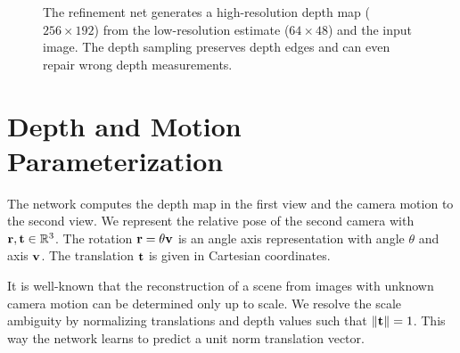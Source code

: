 \documentclass[10pt,twocolumn,letterpaper]{article}
\begin{document}
\begin{figure}
\begin{center}
\end{center}
\vspace{\capvspace}%
\caption{%
The refinement net generates a high-resolution depth map ($256\times192$) from the low-resolution estimate ($64\times48$) and the input image.
The depth sampling preserves depth edges and can even repair wrong depth measurements. %
}
\label{fig:refinement_comparison}
\vspace{\figvspace}
\end{figure}



\section{Depth and Motion Parameterization}
\label{sec:parametrization}
The network computes the depth map in the first view and the camera motion to the second view.
We represent the relative pose of the second camera with $\mathbf{r}, \mathbf{t} \in \mathbb R^3$.
The rotation $\mathbf{r} = \theta \mathbf{v}$ is an angle axis representation with angle $\theta$ and axis $\mathbf{v}$.
The translation $\mathbf{t}$ is given in Cartesian coordinates.

It is well-known that the reconstruction of a scene from images with unknown camera motion can be determined only up to scale.
We resolve the scale ambiguity by normalizing translations and depth values such that $\Vert \mathbf{t} \Vert = 1$.
This way the network learns to predict a unit norm translation vector.
\end{document}
